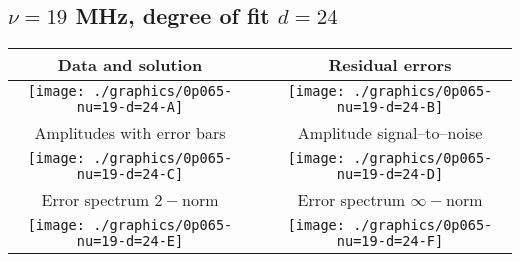 

% 

\clearpage{}
\break{}

\subsection{$\nu = 19$ MHz, degree of fit $d = 24$}

\begin{table}[h]
    \begin{center}
        \begin{tabular}{ccc}
            Data and solution & \quad & Residual errors \\\hline
            \texttt{[image: ./graphics/0p065-nu=19-d=24-A]} &&
            \texttt{[image: ./graphics/0p065-nu=19-d=24-B]} \\[15pt]
            Amplitudes with error bars && Amplitude signal--to--noise \\\hline
            \texttt{[image: ./graphics/0p065-nu=19-d=24-C]} &&
            \texttt{[image: ./graphics/0p065-nu=19-d=24-D]} \\[15pt]
            Error spectrum $2-$norm && Error spectrum $\infty-$norm \\\hline
            \texttt{[image: ./graphics/0p065-nu=19-d=24-E]} &&
            \texttt{[image: ./graphics/0p065-nu=19-d=24-F]} \\[15pt]
        \end{tabular}
    \end{center}
\label{fig:elev=65, nu=19}
\end{table}



\endinput
